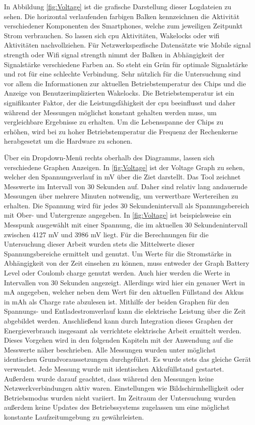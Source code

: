 In Abbildung \ref{fig:Voltage} ist die grafische Darstellung dieser Logdateien zu sehen. Die horizontal verlaufenden farbigen Balken kennzeichnen die Aktivität verschiedener Komponenten des Smartphones, welche zum jeweiligen Zeitpunkt Strom verbrauchen. So lassen sich \ac{cpu} Aktivitäten, Wakelocks oder \ac{wifi} Aktivitäten nachvollziehen. Für Netzwerkspezfische Datensätzte wie \glqq Mobile signal strength\grqq{} oder \glqq Wifi signal strength\grqq{} nimmt der Balken in Abhängigkeit der Signalstärke verschiedene Farben an. So steht ein Grün für optimale Signalstärke und rot für eine schlechte Verbindung. Sehr nützlich für die Untersuchung sind vor allem die Informationen zur aktuellen Betriebstemperatur des Chips und die Anzeige von Benutzerimplizierten Wakelocks. Die Betriebstemperatur ist ein signifikanter Faktor, der die Leistungsfähigkeit der \ac{cpu} beeinflusst und daher während der Messungen möglichst konstant gehalten werden muss, um vergleichbare Ergebnisse zu erhalten. Um die Lebensspanne der Chips zu erhöhen, wird bei zu hoher Betriebstemperatur die Frequenz der Rechenkerne herabgesetzt um die Hardware zu schonen.

Über ein Dropdown-Menü rechts oberhalb des Diagramms, lassen sich verschiedene Graphen Anzeigen. In \autoref{fig:Voltage} ist der Voltage Graph zu sehen, welcher den Spannungsverlauf in \ac{mV} über die Ziet darstellt. Das Tool zeichnet Messwerte im Intervall von 30 Sekunden auf. Daher sind relativ lang andauernde Messungen über mehrere Minuten notwendig, um verwertbare Wertereihen zu erhalten. Die Spannung wird für jedes 30 Sekundenintervall als Spannungsbereich mit Ober- und Untergrenze angegeben. In \autoref{fig:Voltage} ist beispielsweise ein Messpunk ausgewählt mit einer Spannung, die im aktuellen 30 Sekundenintervall zwischen 4127 \ac{mV} und 3986 \ac{mV} liegt. Für die Berechnungen für die Untersuchung dieser Arbeit wurden stets die Mittelwerte dieser Spannungsbereiche ermittelt und genutzt. Um Werte für die Stromstärke in Abhängigkeit von der Zeit einsehen zu können, muss entweder der Graph Battery Level oder Coulomb charge genutzt werden. Auch hier werden die Werte in Intervallen von 30 Sekunden angezeigt. Allerdings wird hier ein genauer Wert in \ac{mA} angegeben, welcher neben dem Wert für den aktuellen Füllstand des Akkus in \ac{mAh} als \glqq Charge rate\grqq{} abzulesen ist. Mithilfe der beiden Graphen für den Spannungs- und Entladestromverlauf kann die elektrische Leistung über die Zeit abgebildet werden. Anschließend kann durch Integration dieses Graphen der Energieverbrauch insgesamt als verrichtete elektrische Arbeit ermittelt werden. Dieses Vorgehen wird in den folgenden Kapiteln mit der Anwendung auf die Messwerte näher beschrieben. Alle Messungen wurden unter möglichst identischen Grundvoraussetzungen durchgeführt. Es wurde stets das gleiche Gerät verwendet. Jede Messung wurde mit identischen Akkufüllstand gestartet. Außerdem wurde darauf geachtet, dass während den Messungen keine Netzwerkverbindungen aktiv waren. Einstellungen wie Bildschirmhelligkeit oder Betriebsmodus wurden nicht variiert. Im Zeitraum der Untersuchung wurden außerdem keine Updates des Betriebssystems zugelassen um eine möglichst konstante Laufzeitumgebung zu gewährleisten.

